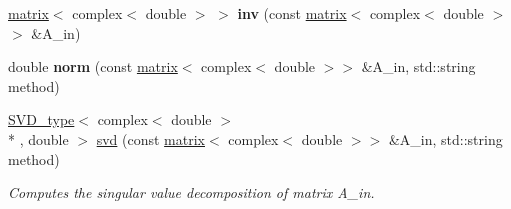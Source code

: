 \begin{DoxyCompactItemize}
\item 
\hypertarget{namespacekeycpp_ac9cabca49e9650ae8b5aadf5ee2f7f4e}{\hyperlink{classkeycpp_1_1matrix}{matrix}$<$ complex$<$ double $>$ $>$ {\bfseries inv} (const \hyperlink{classkeycpp_1_1matrix}{matrix}$<$ complex$<$ double $>$$>$ \&A\-\_\-in)}\label{namespacekeycpp_ac9cabca49e9650ae8b5aadf5ee2f7f4e}

\item 
\hypertarget{namespacekeycpp_a55e5e5bd17f11bc2585161c4229e6eaf}{double {\bfseries norm} (const \hyperlink{classkeycpp_1_1matrix}{matrix}$<$ complex$<$ double $>$$>$ \&A\-\_\-in, std\-::string method)}\label{namespacekeycpp_a55e5e5bd17f11bc2585161c4229e6eaf}

\item 
\hypertarget{namespacekeycpp_a72ae28f3433b8617a1252c7995fc21db}{\hyperlink{classkeycpp_1_1_s_v_d__type}{S\-V\-D\-\_\-type}$<$ complex$<$ double $>$\\*
, double $>$ \hyperlink{namespacekeycpp_a72ae28f3433b8617a1252c7995fc21db}{svd} (const \hyperlink{classkeycpp_1_1matrix}{matrix}$<$ complex$<$ double $>$$>$ \&A\-\_\-in, std\-::string method)}\label{namespacekeycpp_a72ae28f3433b8617a1252c7995fc21db}

\begin{DoxyCompactList}\small\item\em Computes the singular value decomposition of matrix A\-\_\-in. \end{DoxyCompactList}\end{DoxyCompactItemize}


